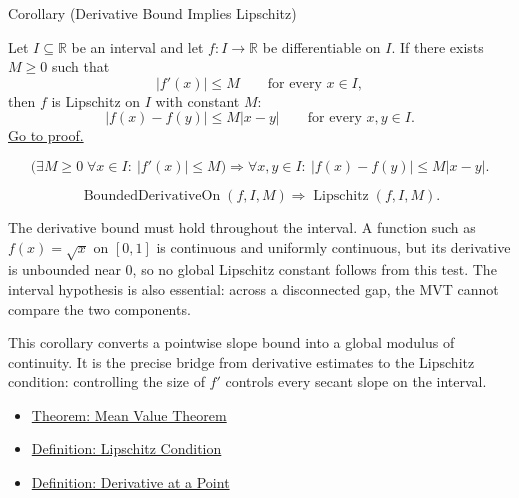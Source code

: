 
\begin{corollarybox}{Corollary (Derivative Bound Implies Lipschitz)}
\begin{corollary}
\label{cor:derivative-bound-implies-lipschitz}
Let \(I\subseteq\mathbb{R}\) be an interval and let \(f:I\to\mathbb{R}\) be differentiable on \(I\). If there exists \(M\geq 0\) such that
\[
  |f'(x)|\leq M
  \qquad\text{for every }x\in I,
\]
then \(f\) is Lipschitz on \(I\) with constant \(M\):
\[
  |f(x)-f(y)|\leq M|x-y|
  \qquad\text{for every }x,y\in I.
\]
\hyperref[prf:derivative-bound-implies-lipschitz]{Go to proof.}
\end{corollary}
\end{corollarybox}

\begin{remark*}
\[
  \bigl(\exists M\geq 0\;\forall x\in I:\ |f'(x)|\leq M\bigr)
  \Longrightarrow
  \forall x,y\in I:\ |f(x)-f(y)|\leq M|x-y|.
\]
\end{remark*}

\begin{remark*}
\[
  \operatorname{BoundedDerivativeOn}(f,I,M)
  \Longrightarrow
  \operatorname{Lipschitz}(f,I,M).
\]
\end{remark*}

\begin{remark*}
The derivative bound must hold throughout the interval. A function such as \(f(x)=\sqrt{x}\) on \([0,1]\) is continuous and uniformly continuous, but its derivative is unbounded near \(0\), so no global Lipschitz constant follows from this test. The interval hypothesis is also essential: across a disconnected gap, the MVT cannot compare the two components.
\end{remark*}

\begin{remark*}[Interpretation]
This corollary converts a pointwise slope bound into a global modulus of continuity. It is the precise bridge from derivative estimates to the Lipschitz condition: controlling the size of \(f'\) controls every secant slope on the interval.
\end{remark*}

\begin{dependencies}
\begin{itemize}
  \item \hyperref[thm:mean-value-theorem]{Theorem: Mean Value Theorem}
  \item \hyperref[def:lipschitz-condition]{Definition: Lipschitz Condition}
  \item \hyperref[def:derivative-at-a-point]{Definition: Derivative at a Point}
\end{itemize}
\end{dependencies}

